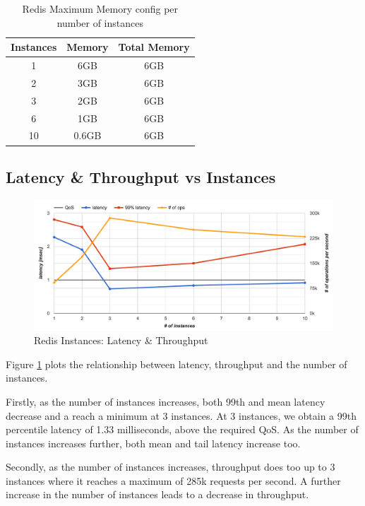 \begin{table}[h!]
\centering
\begin{tabular}{| c c c |}
 \hline
 Instances & Memory & Total Memory\\ [0.5ex]
 \hline\hline

 1  & 6GB & 6GB \\
 2  & 3GB & 6GB \\
 3  & 2GB & 6GB \\
 6  &  1GB & 6GB \\
 10 &  0.6GB & 6GB \\
 \hline

\end{tabular}
\caption{Redis Maximum Memory config per number of instances}
\label{tab:redis_instances}
\end{table}


\subsection{Latency \& Throughput vs Instances}
\begin{figure}[h]
    \includegraphics[width=\textwidth]{./res2/r_instances_latency.png}
    \caption{Redis Instances: Latency \& Throughput}
    \label{fig:r_instances_latency}
\end{figure}

Figure \ref{fig:r_instances_latency} plots the relationship between latency, throughput and the number of instances.

Firstly, as the number of instances increases, both 99th and mean latency decrease and a reach a minimum at 3 instances. At 3 instances, we obtain a 99th percentile latency of 1.33 milliseconds, above the required QoS. As the number of instances increases further, both mean and tail latency increase too.

Secondly, as the number of instances increases, throughput does too up to 3 instances where it reaches a maximum of 285k requests per second. A further increase in the number of instances leads to a decrease in throughput.

